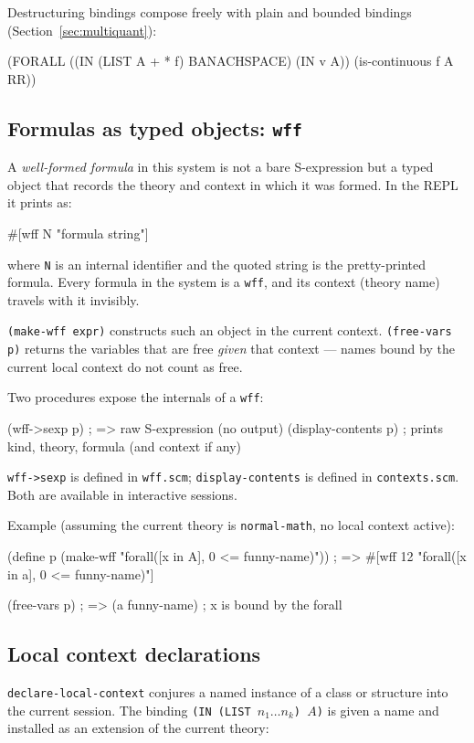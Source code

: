 \documentclass{amsbook}[openany]
\theoremstyle{definition}
\theoremstyle{remark}
\theoremstyle{remark}
\begin{document}
Destructuring bindings compose freely with plain and bounded bindings
(Section~\ref{sec:multiquant}):
\begin{VNBsnip}
(FORALL ((IN (LIST A + * f) BANACHSPACE) (IN v A))
  (is-continuous f A RR))
\end{VNBsnip}

\subsection{Formulas as typed objects: \texttt{wff}}

A \emph{well-formed formula} in this system is not a bare S-expression
but a typed object that records the theory and context in which it was
formed.  In the REPL it prints as:
\begin{VNBsnip}
#[wff N "formula string"]
\end{VNBsnip}
where \texttt{N} is an internal identifier and the quoted string is the
pretty-printed formula.  Every formula in the system is a \texttt{wff},
and its context (theory name) travels with it invisibly.

\texttt{(make-wff expr)} constructs such an object in the current
context.  \texttt{(free-vars p)} returns the variables that are free
\emph{given} that context --- names bound by the current local context
do not count as free.

Two procedures expose the internals of a \texttt{wff}:
\begin{VNBsnip}
(wff->sexp p)        ; => raw S-expression (no output)
(display-contents p) ; prints kind, theory, formula (and context if any)
\end{VNBsnip}
\texttt{wff->sexp} is defined in \texttt{wff.scm};
\texttt{display-contents} is defined in \texttt{contexts.scm}.
Both are available in interactive sessions.

Example (assuming the current theory is \texttt{normal-math}, no local
context active):
\begin{VNBsnip}
(define p (make-wff "forall([x in A], 0 <= funny-name)"))
; => #[wff 12 "forall([x in a], 0 <= funny-name)"]

(free-vars p)
; => (a funny-name)   ; x is bound by the forall
\end{VNBsnip}

\subsection{Local context declarations}

\texttt{declare-local-context} conjures a named instance of a class or
structure into the current session.  The binding
\texttt{(IN (LIST $n_1\ldots n_k$) $A$)} is given a name and installed
as an extension of the current theory:
\end{document}
